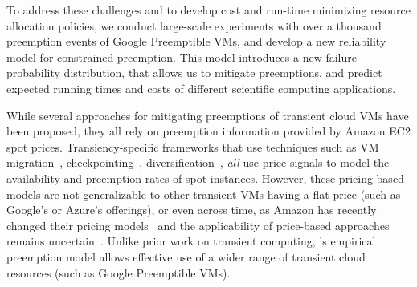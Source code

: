 To address these challenges and to develop cost and run-time minimizing resource allocation policies, we conduct large-scale experiments with over a thousand preemption events of Google Preemptible VMs, and develop a new reliability model for constrained preemption. 
This model introduces a new failure probability distribution, that allows us to mitigate preemptions, and predict expected running times and costs of different scientific computing applications. 

While several approaches for mitigating preemptions of transient cloud VMs have been proposed, they all rely on preemption information provided by Amazon EC2 spot prices.
Transiency-specific frameworks that use techniques such as VM migration~\cite{spotcheck}, checkpointing~\cite{flint, marathe2014exploiting}, diversification~\cite{exosphere}, \emph{all} use price-signals to model the availability and preemption rates of spot instances. 
However, these pricing-based models are not generalizable to other transient VMs having a flat price (such as Google's or Azure's offerings), or even across time, as Amazon has recently changed their pricing models~\cite{bid-change} and the applicability of price-based approaches remains uncertain~\cite{spotweb}. 
Unlike prior work on transient computing, \sysname's empirical preemption model allows effective use of a wider range of transient cloud resources (such as Google Preemptible VMs). 






